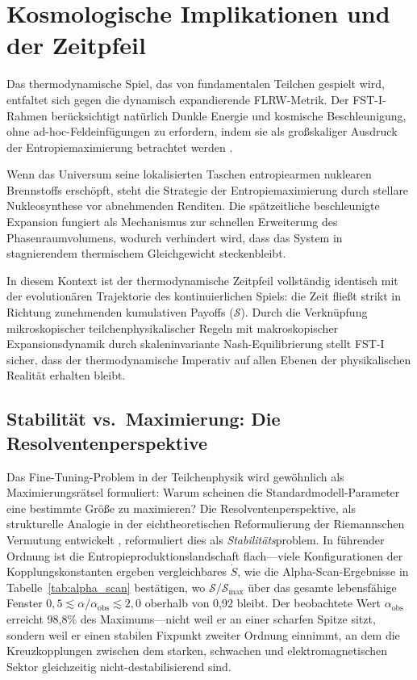 \documentclass[12pt,a4paper]{article}
\theoremstyle{remark}
\begin{document}
\section{Kosmologische Implikationen und der Zeitpfeil}
\label{sec:cosmology}

Das thermodynamische Spiel, das von fundamentalen Teilchen gespielt wird, entfaltet sich gegen die dynamisch expandierende FLRW-Metrik. Der FST-I-Rahmen berücksichtigt nat\"urlich Dunkle Energie und kosmische Beschleunigung, ohne ad-hoc-Feldeinf\"ugungen zu erfordern, indem sie als gro\ss{}skaliger Ausdruck der Entropiemaximierung betrachtet werden \citep{HiggsVEV2024}.

Wenn das Universum seine lokalisierten Taschen entropiearmen nuklearen Brennstoffs ersch\"opft, steht die Strategie der Entropiemaximierung durch stellare Nukleosynthese vor abnehmenden Renditen. Die sp\"atzeitliche beschleunigte Expansion fungiert als Mechanismus zur schnellen Erweiterung des Phasenraumvolumens, wodurch verhindert wird, dass das System in stagnierendem thermischem Gleichgewicht steckenbleibt.

In diesem Kontext ist der thermodynamische Zeitpfeil vollst\"andig identisch mit der evolution\"aren Trajektorie des kontinuierlichen Spiels: die Zeit flie\ss{}t strikt in Richtung zunehmenden kumulativen Payoffs ($\mathcal{S}$). Durch die Verkn\"upfung mikroskopischer teilchenphysikalischer Regeln mit makroskopischer Expansionsdynamik durch skaleninvariante Nash-Equilibrierung stellt FST-I sicher, dass der thermodynamische Imperativ auf allen Ebenen der physikalischen Realit\"at erhalten bleibt.

\subsection{Stabilit\"at vs.\ Maximierung: Die Resolventenperspektive}

Das Fine-Tuning-Problem in der Teilchenphysik wird gew\"ohnlich als Maximierungsr\"atsel formuliert: Warum scheinen die Standardmodell-Parameter eine bestimmte Gr\"o\ss{}e zu maximieren? Die Resolventenperspektive, als strukturelle Analogie in der eichtheoretischen Reformulierung der Riemannschen Vermutung entwickelt \citep{GeigerRH2026b}, reformuliert dies als \emph{Stabilit\"ats}problem. In f\"uhrender Ordnung ist die Entropieproduktionslandschaft flach---viele Konfigurationen der Kopplungskonstanten ergeben vergleichbares $\dot{S}$, wie die Alpha-Scan-Ergebnisse in Tabelle~\ref{tab:alpha_scan} best\"atigen, wo $\mathcal{S}/\mathcal{S}_{\text{max}}$ \"uber das gesamte lebensfähige Fenster $0{,}5 \lesssim \alpha/\alpha_{\text{obs}} \lesssim 2{,}0$ oberhalb von 0,92 bleibt. Der beobachtete Wert $\alpha_{\text{obs}}$ erreicht 98,8\% des Maximums---nicht weil er an einer scharfen Spitze sitzt, sondern weil er einen stabilen Fixpunkt zweiter Ordnung einnimmt, an dem die Kreuzkopplungen zwischen dem starken, schwachen und elektromagnetischen Sektor gleichzeitig nicht-destabilisierend sind.
\end{document}
